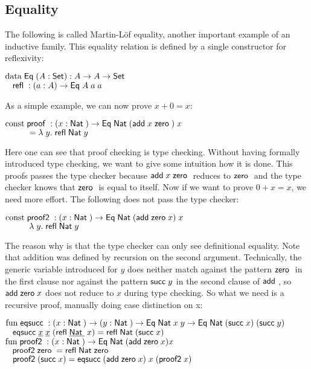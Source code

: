 \subsection{Equality}
The following is called Martin-L\"of equality, another important example of an inductive family.
This equality relation is defined by a single constructor for reflexivity:
\begin{bsp}
$\mathrm{data}\; \mathsf{Eq}\; ( A : \mathsf{Set} ) : A \rightarrow A \rightarrow \mathsf{Set} $ \\
$\hspace*{3mm} \mathsf{refl}\; : ( a : A ) \rightarrow{\mathsf{Eq}\;A \; a \; a}$
\end{bsp}
As a simple example, we can now prove $ x + 0 = x $:
\begin{bsp}
$ \mathrm{const}\; \mathsf{proof}\; : ( x : \mathsf{Nat}\; ) \rightarrow{\mathsf{Eq}\;\mathsf{Nat}\;(\mathsf{add}\;x \; \mathsf{zero}\;)\; x} $ \\ 
$ \spcx = \lam{y}\refl \Nat y$ 
\end{bsp}
Here one can see that proof checking is type checking.
Without having formally introduced type checking, we want to give some intuition how it is done.
This proofs passes the type checker because $\mathsf{add}\; x \; \mathsf{zero}\;$ reduces to $\mathsf{zero}\;$ and the type checker knows that $\mathsf{zero}\;$ is equal to itself.
Now if we want to prove $ 0 +  x = x $, we need more effort.
The following does not pass the type checker:
\begin{bsp}
$ \mathrm{const}\; \mathsf{proof2}\; : ( x : \mathsf{Nat}\; ) \rightarrow{\mathsf{Eq}\;\mathsf{Nat}\;(\mathsf{add}\;\mathsf{zero}\;x)\; x} $ \\ 
$ \spcx \lam{y} \refl \Nat y$ 
\end{bsp}
The reason why is that the type checker can only see definitional equality.
Note that addition was defined by recursion on the second argument.
Technically, the generic variable introduced for $y$ does neither match against the pattern $\mathsf{zero}\;$ in the first clause
nor against the pattern $\mathsf{succ}\; y$ in the second clause of $\mathsf{add}\;$, so $\mathsf{add}\; \mathsf{zero}\; x$ does not reduce to $x$ during type checking.
So what we need is a recursive proof, manually doing case distinction on x:
\begin{bsp}
$\mathrm{fun}\; \mathsf{eqsucc}\; : ( x : \mathsf{Nat}\; ) \rightarrow( y : \mathsf{Nat}\; ) \rightarrow \mathsf{Eq}\; \mathsf{Nat}\; x \; y \rightarrow \mathsf{Eq}\; \mathsf{Nat}\; (\mathsf{succ}\; x) \; (\mathsf{succ}\; y)$ \\
$\hspace*{3mm} \mathsf{eqsucc}\; \underline{x} \; \underline{x} \; (\mathsf{refl}\; \underline{\mathsf{Nat}\;} \; x) = \mathsf{refl}\; \mathsf{Nat}\; (\mathsf{succ}\; x)$
\vs\\
$\mathrm{fun}\; \mathsf{proof2}\; : ( x : \mathsf{Nat}\; ) \rightarrow \mathsf{Eq}\; \mathsf{Nat}\; (\mathsf{add}\; \mathsf{zero}\; x) x$\\
$\hspace*{3mm} \mathsf{proof2}\; \mathsf{zero}\; = \mathsf{refl}\; \mathsf{Nat}\; \mathsf{zero}\;$\\
$\hspace*{3mm} \mathsf{proof2}\; (\mathsf{succ}\; x) = \mathsf{eqsucc}\; (\mathsf{add}\; \mathsf{zero}\; x)\; x \; (\mathsf{proof2}\; x)$
\end{bsp}

